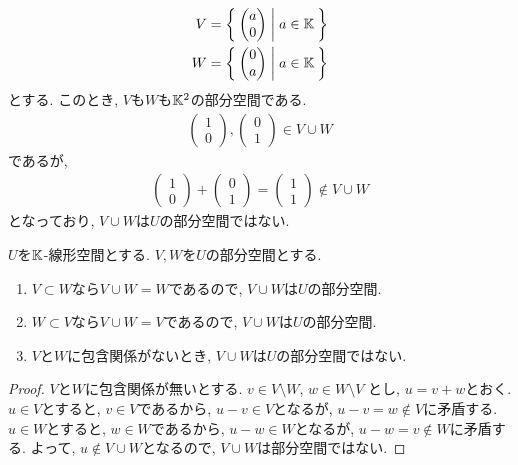 \begin{example}
  \label{subspace:nonexample:cup}
  \begin{align*}
    V&=\Set{\begin{pmatrix}a\\0\end{pmatrix}|a\in\mathbb{K}}\\
    W&=\Set{\begin{pmatrix}0\\a\end{pmatrix}|a\in\mathbb{K}}
  \end{align*}
  とする.
  このとき, $V$も$W$も$\mathbb{K}^2$の部分空間である.
  \begin{align*}
    \begin{pmatrix}1\\0\end{pmatrix},
    \begin{pmatrix}0\\1\end{pmatrix}\in V\cup W
  \end{align*}
  であるが,
  \begin{align*}
    \begin{pmatrix}1\\0\end{pmatrix}+
    \begin{pmatrix}0\\1\end{pmatrix}=\begin{pmatrix}1\\1\end{pmatrix}\not\in V\cup W
  \end{align*}
  となっており, $V\cup W$は$U$の部分空間ではない.
\end{example}

\begin{example}
  $U$を$\mathbb{K}$-線形空間とする.
  $V, W$を$U$の部分空間とする.
  \begin{enumerate}
    \item $V\subset W$なら$V\cup W=W$であるので, $V\cup W$は$U$の部分空間.
    \item $W\subset V$なら$V\cup W=V$であるので, $V\cup W$は$U$の部分空間.
    \item $V$と$W$に包含関係がないとき, $V\cup W$は$U$の部分空間ではない. 
  \end{enumerate}
\end{example}
\begin{proof}
  $V$と$W$に包含関係が無いとする.
  $v\in V\setminus W$, $w\in W\setminus V$
  とし, $u=v+w$とおく.
  $u\in V$とすると, $v\in V$であるから, $u-v\in V$となるが,
  $u-v=w\not\in V$に矛盾する.
  $u\in W$とすると, $w\in W$であるから, $u-w\in W$となるが,
  $u-w=v\not\in W$に矛盾する.
  よって, $u\not\in V\cup W$となるので, $V\cup W$は部分空間ではない.
\end{proof}



